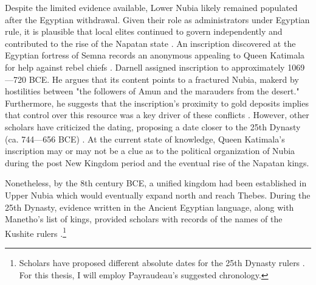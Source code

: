 Despite the limited evidence available, Lower Nubia likely remained populated after the Egyptian withdrawal. Given their role as administrators under Egyptian rule, it is plausible that local elites continued to govern independently and contributed to the rise of the Napatan state \parencites[p.~116]{edwardsNubianArchaeologySudan2004}[p.~111]{törökKingdomKushHandbook1997}. An inscription discovered at the Egyptian fortress of Semna records an anonymous appealing to Queen Katimala for help against rebel chiefs \parencites{darnellInscriptionQueenKatimala2006}[p.~296]{törökTwoWorldsFrontier2009}. Darnell assigned inscription to approximately 1069---720 BCE. He argues that its content points to a fractured Nubia, makerd by hostilities between "the followers of Amun and the marauders from the desert." Furthermore, he suggests that the inscription's proximity to gold deposits implies that control over this resource was a key driver of these conflicts \parencite[p.~60]{darnellInscriptionQueenKatimala2006}. However, other scholars have criticized the dating, proposing a date closer to the 25th Dynasty (ca. 744---656 BCE) \parencite[p.~298]{törökTwoWorldsFrontier2009}. At the current state of knowledge, Queen Katimala's inscription may or may not be a clue as to the political organization of Nubia during the post New Kingdom period and the eventual rise of the Napatan kings.


Nonetheless, by the 8th century BCE, a unified kingdom had been established in Upper Nubia which would eventually expand north and reach Thebes. During the 25th Dynasty, evidence written in the Ancient Egyptian language, along with Manetho's list of kings, provided scholars with records of the names of the Kushite rulers \parencites{payraudeauRetourSuccessionShabaqoShabataqo2014}{pope25thDynasty2019}.\footnote{Scholars have proposed different absolute dates for the 25th Dynasty rulers \parencites{depuydtDatePiyesEgyptian1993}{kahnInscriptionSargonII2001}{hornungKushiteRulersPre25th2006}{payraudeauRetourSuccessionShabaqoShabataqo2014}. For this thesis, I will employ Payraudeau's suggested chronology.}


